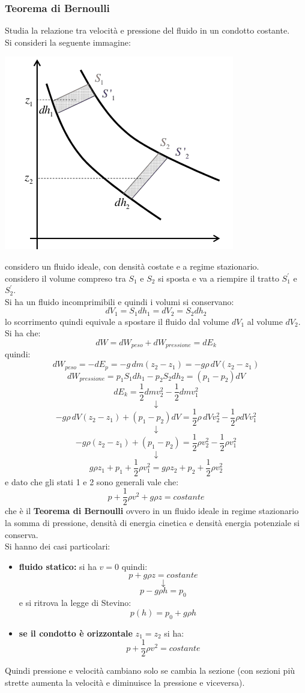 \documentclass[a4paper,12pt, oneside]{book}
\begin{document}
\subsubsection{Teorema di Bernoulli}
Studia la relazione tra velocità e pressione del fluido in un condotto costante.\\
Si consideri la seguente immagine:
\begin{center}
	\includegraphics[scale=0.7]{img/flu6.png}
\end{center}
considero un fluido ideale, con densità costate e a regime stazionario.\\
considero il volume compreso tra $S_1$ e $S_2$ si sposta e va a riempire il tratto $S_1^{'}$ e $S_2^{'}$.\\
Si ha un fluido incomprimibili e quindi i volumi si conservano:
$$dV_1=S_1dh_1=dV_2=S_2dh_2$$
lo scorrimento quindi equivale a spostare il fluido dal volume $dV_1$ al volume $dV_2$.\\
Si ha che:
$$dW=dW_{peso}+dW_{pressione}=dE_k$$
quindi:
$$dW_{peso}=-dE_p=-g\,dm(z_2-z_1)=-g\rho\,dV(z_2-z_1)$$
$$dW_{pressione}=p_1S_1dh_1-p_2S_2dh_2=(p_1-p_2)dV$$
$$dE_k=\frac{1}{2}dmv_2^2-\frac{1}{2}dmv_1^2$$
$$\downarrow$$
$$-g\rho\,dV(z_2-z_1)+(p_1-p_2)dV=\frac{1}{2}\rho\,dVv_2^2-\frac{1}{2}\rho dVv_1^2$$
$$\downarrow$$
$$-g\rho(z_2-z_1)+(p_1-p_2)=\frac{1}{2}\rho v_2^2-\frac{1}{2}\rho v_1^2$$
$$\downarrow$$
$$g\rho z_1+p_1+\frac{1}{2}\rho v_1^2=g\rho z_2+p_2+\frac{1}{2}\rho v_2^2$$
e dato che gli stati 1 e 2 sono generali vale che:
$$p+\frac{1}{2}\rho v^2+g\rho z=costante$$
che è il \textbf{Teorema di Bernoulli} ovvero in un fluido ideale in regime stazionario 	la somma di pressione, densità di energia cinetica e densità energia potenziale si conserva.\\
Si hanno dei casi particolari:
\begin{itemize}
	\item \textbf{fluido statico:} si ha $v=0$ quindi:
	      $$p+g\rho z=costante$$
	      $$\downarrow$$
	      $$p-g\rho h=p_0$$
	      e si ritrova la legge di Stevino:
	      $$p(h)=p_0+g\rho h$$
	\item \textbf{se il condotto è orizzontale} $z_1=z_2$ si ha:
	      $$p+\frac{1}{2}\rho v^2=costante$$
\end{itemize}
Quindi pressione e velocità cambiano solo se cambia la sezione (con sezioni più strette aumenta la velocità e diminuisce la pressione e viceversa).
\end{document}
